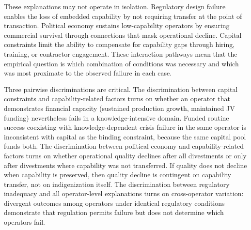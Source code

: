 These explanations may not operate in isolation. Regulatory design
failure enables the loss of embedded capability by not requiring
transfer at the point of transaction. Political economy sustains
low-capability operators by ensuring commercial survival through
connections that mask operational decline. Capital constraints limit the
ability to compensate for capability gaps through hiring, training, or
contractor engagement. These interaction pathways mean that the
empirical question is which combination of conditions was necessary and
which was most proximate to the observed failure in each case.

Three pairwise discriminations are critical. The discrimination between
capital constraints and capability-related factors turns on whether an
operator that demonstrates financial capacity (sustained production
growth, maintained JV funding) nevertheless fails in a
knowledge-intensive domain. Funded routine success coexisting with
knowledge-dependent crisis failure in the same operator is inconsistent
with capital as the binding constraint, because the same capital pool
funds both. The discrimination between political economy and
capability-related factors turns on whether operational quality declines
after all divestments or only after divestments where capability was not
transferred. If quality does not decline when capability is preserved,
then quality decline is contingent on capability transfer, not on
indigenization itself. The discrimination between regulatory inadequacy
and all operator-level explanations turns on cross-operator variation:
divergent outcomes among operators under identical regulatory conditions
demonstrate that regulation permits failure but does not determine which
operators fail.


